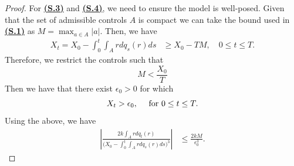 \documentclass[11pt]{article}
\newtheorem*{obs*}{Remark}
\theoremstyle{definition}
\begin{document}
\begin{proof}
    For \textbf{\hyperref[sup: S.3]{(S.3)}} and \textbf{\hyperref[sup: S.4]{(S.4)}}, we need to ensure the model is well-posed. Given that the set of admissible controls $A$ is compact we can take the bound used in \textbf{\hyperref[sup: S.1]{(S.1)}} as $M=\displaystyle\max_{a \in A} |a|$. Then, we have
    \begin{align*}
            X_t = X_0 - \int_0^t \int_A rdq_s(r) ds &\geq X_0 - TM, \quad  0\leq t\leq T.
    \end{align*}
    Therefore, we restrict the controls such that 
    \begin{equation}\label{condA}
        M < 
        \frac{X_0}{T}
    \end{equation}
    Then we have that there exist $\epsilon_0>0$ for which
    $$X_t > \epsilon_0, \quad \hbox{ for } 0\leq t\leq T.$$
    Using the above, we have
        \begin{align*}
           \left| \frac{2k \displaystyle\int_A r dq_t(r)}{\displaystyle\Big(X_0 - \int_0^t \int_A rdq_s(r) ds\Big)^3} \right| &\leq \frac{2k M}{\epsilon_0^3}.
       \end{align*}


\end{proof}
\end{document}
